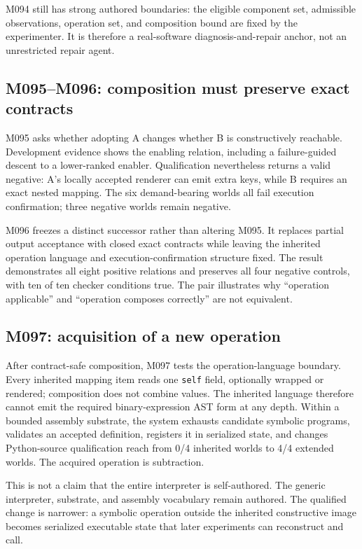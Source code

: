 \documentclass[10pt]{article}
\newcommand{\code}[1]{\texttt{#1}}
\begin{document}
M094 still has strong authored boundaries: the eligible component set, admissible observations, operation set, and composition bound are fixed by the experimenter. It is therefore a real-software diagnosis-and-repair anchor, not an unrestricted repair agent.

\subsection{M095--M096: composition must preserve exact contracts}
M095 asks whether adopting A changes whether B is constructively reachable. Development evidence shows the enabling relation, including a failure-guided descent to a lower-ranked enabler. Qualification nevertheless returns a valid negative: A's locally accepted renderer can emit extra keys, while B requires an exact nested mapping. The six demand-bearing worlds all fail execution confirmation; three negative worlds remain negative.

M096 freezes a distinct successor rather than altering M095. It replaces partial output acceptance with closed exact contracts while leaving the inherited operation language and execution-confirmation structure fixed. The result demonstrates all eight positive relations and preserves all four negative controls, with ten of ten checker conditions true. The pair illustrates why ``operation applicable'' and ``operation composes correctly'' are not equivalent.

\subsection{M097: acquisition of a new operation}
After contract-safe composition, M097 tests the operation-language boundary. Every inherited mapping item reads one \code{self} field, optionally wrapped or rendered; composition does not combine values. The inherited language therefore cannot emit the required binary-expression AST form at any depth. Within a bounded assembly substrate, the system exhausts candidate symbolic programs, validates an accepted definition, registers it in serialized state, and changes Python-source qualification reach from 0/4 inherited worlds to 4/4 extended worlds. The acquired operation is subtraction.

This is not a claim that the entire interpreter is self-authored. The generic interpreter, substrate, and assembly vocabulary remain authored. The qualified change is narrower: a symbolic operation outside the inherited constructive image becomes serialized executable state that later experiments can reconstruct and call.
\end{document}
